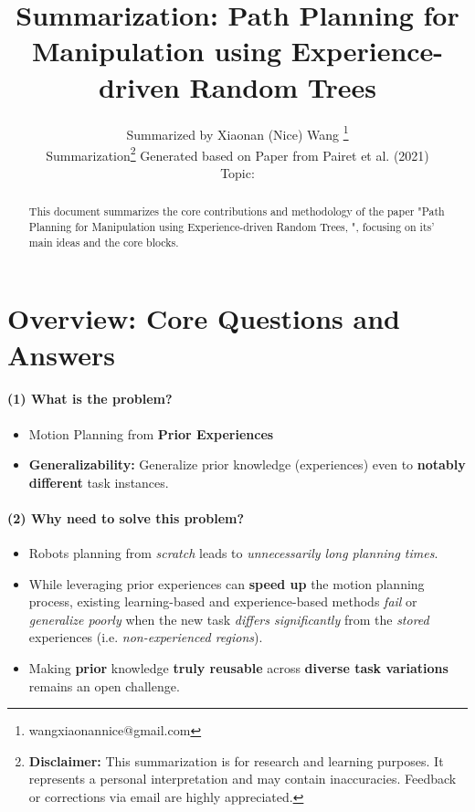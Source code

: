 \documentclass{article}
\title{Summarization: Path Planning for Manipulation using Experience-driven Random Trees}
\author{
  Summarized by Xiaonan (Nice) Wang \thanks{wangxiaonannice@gmail.com} \\
  Summarization\thanks{\textbf{Disclaimer:} This summarization is for research and learning purposes. It represents a personal interpretation and may contain inaccuracies. Feedback or corrections via email are highly appreciated.} Generated based on Paper from Pairet et al. (2021) \\
  Topic: \\
}
\begin{document}
\newcommand{\repeatfootnote}[1]{\textsuperscript{\ref{#1}}}

\maketitle

\begin{abstract}
This document summarizes the core contributions and methodology of the paper "Path Planning for Manipulation using Experience-driven Random Trees, \cite{pairet2021path}", focusing on its' main ideas and the core blocks.
\end{abstract}

\section{Overview: Core Questions and Answers}
                           
\paragraph{(1) What is the problem?} 
\begin{itemize}
  \item Motion Planning from \textbf{Prior Experiences}
  \item \textbf{Generalizability:} Generalize prior knowledge (experiences) even to \textbf{notably different} task instances.
\end{itemize}

\paragraph{(2) Why need to solve this problem?}
\begin{itemize}
  \item Robots planning from \textit{scratch} leads to \textit{unnecessarily long planning times}.
  \item While leveraging prior experiences can \textbf{speed up} the motion planning process, existing learning-based and experience-based methods \textit{fail} or \textit{generalize poorly} when the new task \textit{differs significantly} from the \textit{stored} experiences (i.e. \textit{non-experienced regions}).
  \item Making \textbf{prior} knowledge \textbf{truly reusable} across \textbf{diverse task variations} remains an open challenge.
\end{itemize}
\end{document}
